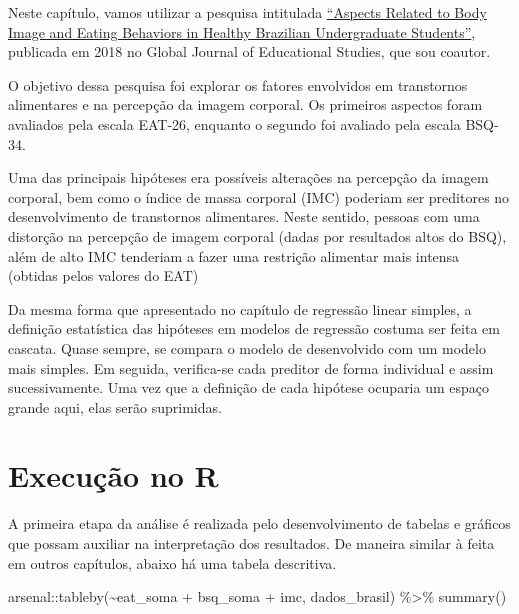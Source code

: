 \documentclass[
]{book}
\newenvironment{Shaded}{\begin{snugshade}}{\end{snugshade}}
\newcommand{\FunctionTok}[1]{\textcolor[rgb]{0.00,0.00,0.00}{#1}}
\newcommand{\NormalTok}[1]{#1}
\newcommand{\SpecialCharTok}[1]{\textcolor[rgb]{0.00,0.00,0.00}{#1}}
\begin{document}
Neste capítulo, vamos utilizar a pesquisa intitulada \href{https://www.researchgate.net/publication/323729370_Aspects_Related_to_Body_Image_and_Eating_Behaviors_in_Healthy_Brazilian_Undergraduate_Students}{``Aspects Related to Body Image and Eating Behaviors in Healthy Brazilian Undergraduate Students''}, publicada em 2018 no Global Journal of Educational Studies, que sou coautor.

O objetivo dessa pesquisa foi explorar os fatores envolvidos em transtornos alimentares e na percepção da imagem corporal. Os primeiros aspectos foram avaliados pela escala EAT-26, enquanto o segundo foi avaliado pela escala BSQ-34.

Uma das principais hipóteses era possíveis alterações na percepção da imagem corporal, bem como o índice de massa corporal (IMC) poderiam ser preditores no desenvolvimento de transtornos alimentares. Neste sentido, pessoas com uma distorção na percepção de imagem corporal (dadas por resultados altos do BSQ), além de alto IMC tenderiam a fazer uma restrição alimentar mais intensa (obtidas pelos valores do EAT)

Da mesma forma que apresentado no capítulo de regressão linear simples, a definição estatística das hipóteses em modelos de regressão costuma ser feita em cascata. Quase sempre, se compara o modelo de desenvolvido com um modelo mais simples. Em seguida, verifica-se cada preditor de forma individual e assim sucessivamente. Uma vez que a definição de cada hipótese ocuparia um espaço grande aqui, elas serão suprimidas.

\hypertarget{execuuxe7uxe3o-no-r-15}{%
\section{Execução no R}\label{execuuxe7uxe3o-no-r-15}}

A primeira etapa da análise é realizada pelo desenvolvimento de tabelas e gráficos que possam auxiliar na interpretação dos resultados. De maneira similar à feita em outros capítulos, abaixo há uma tabela descritiva.

\begin{Shaded}
\begin{Highlighting}[]
\NormalTok{arsenal}\SpecialCharTok{::}\FunctionTok{tableby}\NormalTok{(}\SpecialCharTok{\textasciitilde{}}\NormalTok{eat\_soma }\SpecialCharTok{+}\NormalTok{ bsq\_soma }\SpecialCharTok{+}\NormalTok{ imc, dados\_brasil) }\SpecialCharTok{\%\textgreater{}\%} 
  \FunctionTok{summary}\NormalTok{() }
\end{Highlighting}
\end{Shaded}
\end{document}
